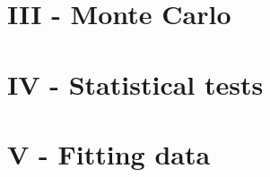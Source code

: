 \documentclass{article}
\begin{document}
\section*{III - Monte Carlo}

\section*{IV - Statistical tests}

\section*{V - Fitting data}



\end{document}

